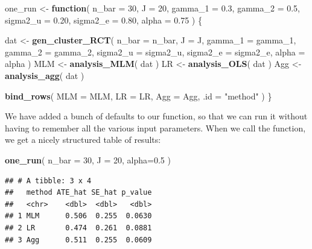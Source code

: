 \documentclass[
]{book}
\newenvironment{Shaded}{\begin{snugshade}}{\end{snugshade}}
\newcommand{\AttributeTok}[1]{\textcolor[rgb]{0.13,0.29,0.53}{#1}}
\newcommand{\ControlFlowTok}[1]{\textcolor[rgb]{0.13,0.29,0.53}{\textbf{#1}}}
\newcommand{\DecValTok}[1]{\textcolor[rgb]{0.00,0.00,0.81}{#1}}
\newcommand{\FloatTok}[1]{\textcolor[rgb]{0.00,0.00,0.81}{#1}}
\newcommand{\FunctionTok}[1]{\textcolor[rgb]{0.13,0.29,0.53}{\textbf{#1}}}
\newcommand{\NormalTok}[1]{#1}
\newcommand{\OtherTok}[1]{\textcolor[rgb]{0.56,0.35,0.01}{#1}}
\newcommand{\StringTok}[1]{\textcolor[rgb]{0.31,0.60,0.02}{#1}}
\begin{document}
\begin{Shaded}
\begin{Highlighting}[]
\NormalTok{one\_run }\OtherTok{\textless{}{-}} \ControlFlowTok{function}\NormalTok{( }
  \AttributeTok{n\_bar =} \DecValTok{30}\NormalTok{, }\AttributeTok{J =} \DecValTok{20}\NormalTok{, }\AttributeTok{gamma\_1 =} \FloatTok{0.3}\NormalTok{, }\AttributeTok{gamma\_2 =} \FloatTok{0.5}\NormalTok{,}
  \AttributeTok{sigma2\_u =} \FloatTok{0.20}\NormalTok{, }\AttributeTok{sigma2\_e =} \FloatTok{0.80}\NormalTok{, }\AttributeTok{alpha =} \FloatTok{0.75} 
\NormalTok{) \{}
  
\NormalTok{  dat }\OtherTok{\textless{}{-}} \FunctionTok{gen\_cluster\_RCT}\NormalTok{(}
    \AttributeTok{n\_bar =}\NormalTok{ n\_bar, }\AttributeTok{J =}\NormalTok{ J, }\AttributeTok{gamma\_1 =}\NormalTok{ gamma\_1, }\AttributeTok{gamma\_2 =}\NormalTok{ gamma\_2,}
    \AttributeTok{sigma2\_u =}\NormalTok{ sigma2\_u, }\AttributeTok{sigma2\_e =}\NormalTok{ sigma2\_e, }\AttributeTok{alpha =}\NormalTok{ alpha }
\NormalTok{  )}
\NormalTok{  MLM }\OtherTok{\textless{}{-}} \FunctionTok{analysis\_MLM}\NormalTok{( dat )}
\NormalTok{  LR }\OtherTok{\textless{}{-}} \FunctionTok{analysis\_OLS}\NormalTok{( dat )}
\NormalTok{  Agg }\OtherTok{\textless{}{-}} \FunctionTok{analysis\_agg}\NormalTok{( dat )}
  
  \FunctionTok{bind\_rows}\NormalTok{( }\AttributeTok{MLM =}\NormalTok{ MLM, }\AttributeTok{LR =}\NormalTok{ LR, }\AttributeTok{Agg =}\NormalTok{ Agg, }\AttributeTok{.id =} \StringTok{"method"}\NormalTok{ )}
\NormalTok{\}}
\end{Highlighting}
\end{Shaded}

We have added a bunch of defaults to our function, so that we can run it without having to remember all the various input parameters.
When we call the function, we get a nicely structured table of results:

\begin{Shaded}
\begin{Highlighting}[]
\FunctionTok{one\_run}\NormalTok{( }\AttributeTok{n\_bar =} \DecValTok{30}\NormalTok{, }\AttributeTok{J =} \DecValTok{20}\NormalTok{, }\AttributeTok{alpha=}\FloatTok{0.5}\NormalTok{ )}
\end{Highlighting}
\end{Shaded}

\begin{verbatim}
## # A tibble: 3 x 4
##   method ATE_hat SE_hat p_value
##   <chr>    <dbl>  <dbl>   <dbl>
## 1 MLM      0.506  0.255  0.0630
## 2 LR       0.474  0.261  0.0881
## 3 Agg      0.511  0.255  0.0609
\end{verbatim}
\end{document}

